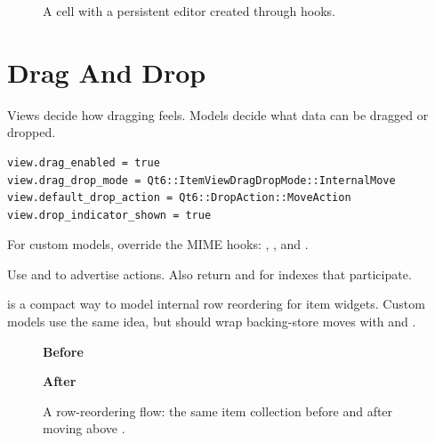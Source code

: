 \begin{figure}[htbp]
  \centering
  \caption{A  cell with a persistent editor created through  hooks.}
\end{figure}

\section{Drag And Drop}

Views decide how dragging feels. Models decide what data can be dragged or dropped.

\begin{lstlisting}[style=crystal]
view.drag_enabled = true
view.drag_drop_mode = Qt6::ItemViewDragDropMode::InternalMove
view.default_drop_action = Qt6::DropAction::MoveAction
view.drop_indicator_shown = true
\end{lstlisting}

For custom models, override the MIME hooks: , , and .

Use  and  to advertise actions. Also return  and  for indexes that participate.

 is a compact way to model internal row reordering for item widgets. Custom models use the same idea, but should wrap backing-store moves with  and .

\begin{figure}[htbp]
  \centering
  \begin{minipage}{0.48\textwidth}
    \centering
    \textbf{Before}\par\smallskip
  \end{minipage}\hfill
  \begin{minipage}{0.48\textwidth}
    \centering
    \textbf{After}\par\smallskip
  \end{minipage}
  \caption{A row-reordering flow: the same item collection before and after moving  above .}
\end{figure}

